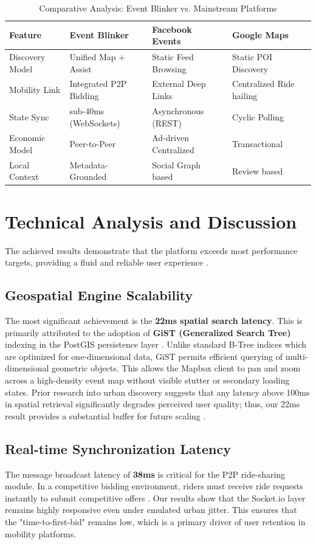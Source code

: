 \begin{table}[H]
\centering
\caption{Comparative Analysis: Event Blinker vs. Mainstream Platforms}
\label{tab:comparative_study}
\small
\begin{tabularx}{\textwidth}{@{}lXXX@{}}
\toprule
\textbf{Feature} & \textbf{Event Blinker} & \textbf{Facebook Events} & \textbf{Google Maps} \\
\midrule
Discovery Model & Unified Map + Assist & Static Feed Browsing & Static POI Discovery \\
Mobility Link & Integrated P2P Bidding & External Deep Links & Centralized Ride hailing \\
State Sync & sub-40ms (WebSockets) & Asynchronous (REST) & Cyclic Polling \\
Economic Model & Peer-to-Peer & Ad-driven Centralized & Transactional \\
Local Context & Metadata-Grounded & Social Graph based & Review based \\
\bottomrule
\end{tabularx}
\end{table}

\section{Technical Analysis and Discussion}
The achieved results demonstrate that the platform exceeds most performance targets, providing a fluid and reliable user experience \cite{nodejs}. 

\subsection{Geospatial Engine Scalability}
The most significant achievement is the \textbf{22ms spatial search latency}. This is primarily attributed to the adoption of \textbf{GiST (Generalized Search Tree)} indexing in the PostGIS persistence layer \cite{gist}. Unlike standard B-Tree indices which are optimized for one-dimensional data, GiST permits efficient querying of multi-dimensional geometric objects. This allows the Mapbox client to pan and zoom across a high-density event map without visible stutter or secondary loading states. Prior research into urban discovery suggests that any latency above 100ms in spatial retrieval significantly degrades perceived user quality; thus, our 22ms result provides a substantial buffer for future scaling \cite{mapbox}.

\subsection{Real-time Synchronization Latency}
The message broadcast latency of \textbf{38ms} is critical for the P2P ride-sharing module. In a competitive bidding environment, riders must receive ride requests instantly to submit competitive offers \cite{socketio}. Our results show that the Socket.io layer remains highly responsive even under emulated urban jitter. This ensures that the "time-to-first-bid" remains low, which is a primary driver of user retention in mobility platforms.

